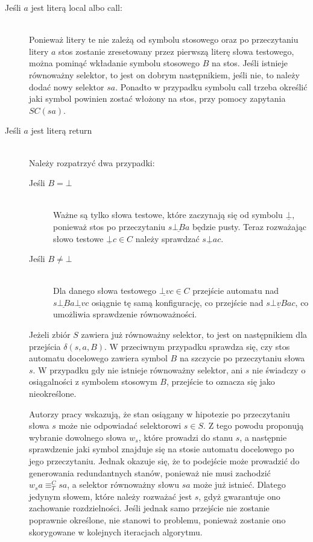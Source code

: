 \clearpage
\begin{description}
    \item[Jeśli $a$ jest literą local albo call:] \hfill \\
        Ponieważ litery te nie zależą od symbolu stosowego oraz po przeczytaniu litery $a$ stos zostanie zresetowany przez pierwszą
        literę słowa testowego, można pominąć wkładanie symbolu stosowego $B$ na stos. Jeśli istnieje równoważny selektor, to jest on dobrym następnikiem,
        jeśli nie, to należy dodać nowy selektor $sa$. Ponadto w przypadku symbolu call trzeba określić jaki symbol powinien zostać włożony na stos,
        przy pomocy zapytania $SC(sa)$.

    \item[Jeśli $a$ jest literą return] \hfill \\
        Należy rozpatrzyć dwa przypadki:
        \begin{description}
            \item[Jeśli $B = \bot$] \hfill \\
                Ważne są tylko słowa testowe, które zaczynają się od symbolu $\underline{\bot}$, ponieważ stos po przeczytaniu $s\underline{\bot B}a$
                będzie pusty. Teraz rozważając słowo testowe $\underline{\bot}c \in C$ należy sprawdzać $s\underline{\bot}ac$.

            \item[Jeśli $B \neq \bot$] \hfill \\
                Dla danego słowa testowego $\underline{\bot v}c \in C$ przejście automatu nad $s\underline{\bot B}a\underline{\bot v}c$ osiągnie
                tę samą konfigurację, co przejście nad $s\underline{\bot vB}ac$, co umożliwia sprawdzenie równoważności.
        \end{description}
        
        Jeżeli zbiór $S$ zawiera już równoważny selektor, to jest on następnikiem dla przejścia $\delta(s, a, B)$.
        W przeciwnym przypadku sprawdza się, czy stos automatu docelowego zawiera symbol $B$ na szczycie
        po przeczytaniu słowa $s$. W przypadku gdy nie istnieje równoważny selektor,
        ani $s$ nie świadczy o osiągalności z symbolem stosowym $B$, przejście to oznacza się jako nieokreślone.
        
        Autorzy pracy wskazują, że stan osiągany w hipotezie
        po przeczytaniu słowa $s$ może nie odpowiadać selektorowi $s \in S$.
        Z tego powodu proponują wybranie dowolnego słowa $w_s$, które prowadzi do stanu $s$, a następnie sprawdzenie
        jaki symbol znajduje się na stosie automatu docelowego po jego przeczytaniu.
        Jednak okazuje się, że to podejście może prowadzić do generowania redundantnych stanów,
        ponieważ nie musi zachodzić $w_sa \equiv^C_T sa$, a selektor
        równoważny słowu $sa$ może już istnieć. Dlatego jedynym słowem, które należy rozważać jest $s$, gdyż gwarantuje ono
        zachowanie rozdzielności. Jeśli jednak samo przejście nie zostanie poprawnie określone, nie stanowi to problemu, ponieważ
        zostanie ono skorygowane w kolejnych iteracjach algorytmu.
        

\end{description}

